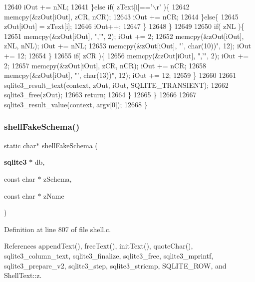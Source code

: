 \begin{DoxyCode}
12640           iOut += nNL;
12641         \}\textcolor{keywordflow}{else} \textcolor{keywordflow}{if}( zText[i]==\textcolor{charliteral}{'\(\backslash\)r'} )\{
12642           memcpy(&zOut[iOut], zCR, nCR);
12643           iOut += nCR;
12644         \}\textcolor{keywordflow}{else}\{
12645           zOut[iOut] = zText[i];
12646           iOut++;
12647         \}
12648       \}
12649 
12650       \textcolor{keywordflow}{if}( zNL )\{
12651         memcpy(&zOut[iOut], \textcolor{stringliteral}{",'"}, 2); iOut += 2;
12652         memcpy(&zOut[iOut], zNL, nNL); iOut += nNL;
12653         memcpy(&zOut[iOut], \textcolor{stringliteral}{"', char(10))"}, 12); iOut += 12;
12654       \}
12655       \textcolor{keywordflow}{if}( zCR )\{
12656         memcpy(&zOut[iOut], \textcolor{stringliteral}{",'"}, 2); iOut += 2;
12657         memcpy(&zOut[iOut], zCR, nCR); iOut += nCR;
12658         memcpy(&zOut[iOut], \textcolor{stringliteral}{"', char(13))"}, 12); iOut += 12;
12659       \}
12660 
12661       sqlite3_result_text(context, zOut, iOut, SQLITE_TRANSIENT);
12662       sqlite3_free(zOut);
12663       \textcolor{keywordflow}{return};
12664     \}
12665   \}
12666 
12667   sqlite3_result_value(context, argv[0]);
12668 \}
\end{DoxyCode}
\mbox{\label{shell_8c_ad231d3e23ccc186d0a0176147c695954}} 
\subsubsection{shell\+Fake\+Schema()}
{\footnotesize\ttfamily static char$\ast$ shell\+Fake\+Schema (\begin{DoxyParamCaption}\item[{\textbf{ sqlite3} $\ast$}]{db,  }\item[{const char $\ast$}]{z\+Schema,  }\item[{const char $\ast$}]{z\+Name }\end{DoxyParamCaption})\hspace{0.3cm}{\ttfamily [static]}}



Definition at line 807 of file shell.\+c.



References append\+Text(), free\+Text(), init\+Text(), quote\+Char(), sqlite3\+\_\+column\+\_\+text, sqlite3\+\_\+finalize, sqlite3\+\_\+free, sqlite3\+\_\+mprintf, sqlite3\+\_\+prepare\+\_\+v2, sqlite3\+\_\+step, sqlite3\+\_\+stricmp, S\+Q\+L\+I\+T\+E\+\_\+\+R\+OW, and Shell\+Text\+::z.




